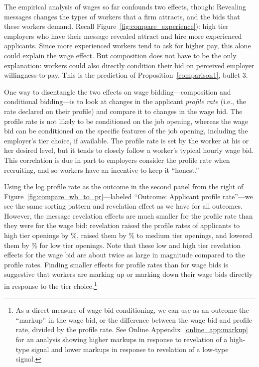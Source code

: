 \documentclass[12pt]{article}
\begin{document}
The empirical analysis of wages so far confounds two effects, though: Revealing messages changes the types of workers that a firm attracts, and the bids that these workers demand. Recall Figure~\ref{fig:compare_experience}):
high tier employers who have their message revealed attract and hire more experienced applicants. Since more experienced workers tend to ask for higher pay, this alone could explain the wage effect. But composition does not have to be the only explanation: workers could also directly condition their bid on perceived employer willingness-to-pay.
This is the prediction of Proposition~\ref{comparison1}, bullet 3. 

One way to disentangle the two effects on wage bidding---composition and conditional bidding---is to look at changes in the applicant {\em profile rate} (i.e., the rate declared on their profile) and compare it to changes in the wage bid.
The profile rate is not likely to be conditioned on the job opening, whereas the wage bid can be conditioned on the specific features of the job opening, including the employer's tier choice, if available. 
The profile rate is set by the worker at his or her desired level, but it tends to closely follow a worker's typical hourly wage bid.
This correlation is due in part to employers consider the profile rate when recruiting, and so workers have an incentive to keep it ``honest.''

Using the log profile rate as the outcome in the second panel from the right of Figure~\ref{fig:compare_wb_to_pr}---labeled ``Outcome: Applicant profile rate''---we see the same sorting pattern and revelation effect as we have for all outcomes.
However, the message revelation effects are much smaller for the profile rate than they were for the wage bid: 
revelation raised the profile rates of applicants to high tier openings by \EffectProfileRateAppHighTierRegression{}\%, raised them by \EffectProfileRateAppMedTierRegression{}\% to medium tier openings, and lowered them by \EffectProfileRateAppLowTierRegression{}\% for low tier openings.
Note that these low and high tier revelation effects for the wage bid are about twice as large in magnitude compared to the profile rates. 
Finding smaller effects for profile rates than for wage bids is suggestive that workers are marking up or marking down their wage bids directly in response to the tier choice.\footnote{
  As a direct measure of wage bid conditioning, we can use as an outcome the ``markup'' in the wage bid, or the difference between the wage bid and profile rate, divided by the profile rate.
  See Online Appendix~\ref{online_app:markup} for an analysis showing higher markups in response to revelation of a high-type signal and lower markups in response to revelation of a low-type signal.
}
\end{document}
